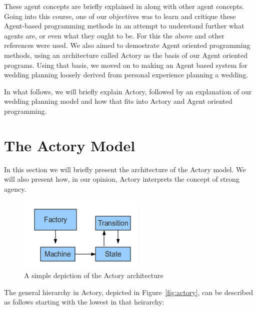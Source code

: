 \documentclass{sig-alternate}
\newcommand{\fig}[1]{Figure~\ref{fig:#1}}
\begin{document}
These agent concepts are briefly explained in \cite{me02m} along with other agent concepts. Going into this course, one of our objectives was to learn and critique these Agent-based programming methods in an attempt to understand further what agents are, or even what they ought to be. For this the above and other references were used. We also aimed to demostrate Agent oriented programming methods, using an architecture called Actory as the basis of our Agent oriented programs. Using that basis, we moved on to making an Agent based system for wedding planning loosely derived from personal experience planning a wedding. 

In what follows, we will briefly explain Actory, followed by an explanation of our wedding planning model and how that fits into Actory and Agent oriented programming.

\section{The Actory Model}
In this section we will briefly present the architecture of the Actory model. We will also present how, in our opinion, Actory interprets the concept of strong agency.

\begin{figure}
\includegraphics{Actory.png}
\caption{A simple depiction of the Actory architecture}
\end{figure}\label{fig:actory}

The general hierarchy in Actory, depicted in \fig{actory}, can be described as follows starting with the lowest in that heirarchy:
\end{document}
